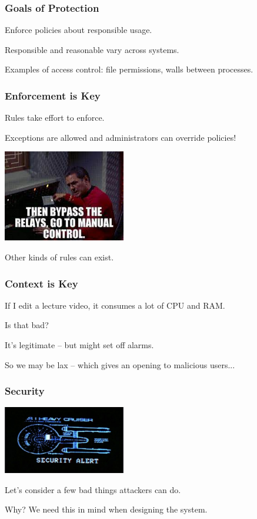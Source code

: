 \begin{frame}
\frametitle{Goals of Protection}

Enforce policies about responsible usage.

Responsible and reasonable vary across systems.

Examples of access control: file permissions, walls between processes.

\end{frame}


\begin{frame}
\frametitle{Enforcement is Key}

Rules take effort to enforce.

Exceptions are allowed and administrators can override policies!

\begin{center}
	\includegraphics[width=0.4\textwidth]{images/override.jpg}
\end{center}

Other kinds of rules can exist.

\end{frame}


\begin{frame}
\frametitle{Context is Key}

If I edit a lecture video, it consumes a lot of CPU and RAM.

Is that bad?

It's legitimate -- but might set off alarms.

So we may be lax -- which gives an opening to malicious users...


\end{frame}



\begin{frame}
\frametitle{Security}

\begin{center}
	\includegraphics[width=0.4\textwidth]{images/security-alert.png}
\end{center}

Let's consider a few bad things attackers can do.

Why? We need this in mind when designing the system.


\end{frame}


